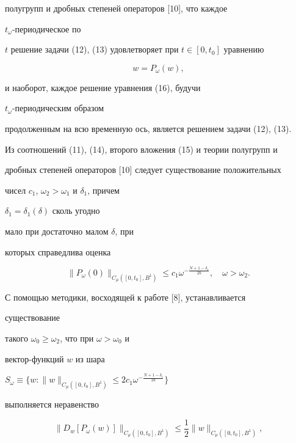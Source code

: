 полугрупп и дробных степеней операторов [10], что каждое 


$t_\omega$-периодическое по 


$t$ решение задачи (12), (13) удовлетворяет при $t\in[0,t_0]$ уравнению 


\begin{equation} 


w=P_\omega(w), 


\end{equation} 


и наоборот, каждое решение уравнения (16), будучи 


$t_\omega$-периодическим образом 


продолженным на всю временную ось, является решением задачи (12), (13). 


 


Из соотношений (11), (14), второго вложения (15) и теории полугрупп и  


дробных степеней операторов [10] следует существование положительных 


чисел $c_1$, $\omega_2>\omega_1$ и $\delta_1$, причем


$\delta_1=\delta_1(\delta)$ сколь угодно 


мало при достаточно малом $\delta$, при 


которых справедлива оценка 


\begin{equation} 


\|P_\omega(0)\|_{C_\mu([0,t_0],B^1)}\le c_1 


\omega^{-\frac{N+1-\delta_1}{2k}},\quad \omega>\omega_2. 


\end{equation} 


С помощью методики, восходящей к работе [8], устанавливается 


существование  


такого $\omega_0\ge\omega_2$, что при $\omega>\omega_0$ и 


вектор-функций $w$ из шара 


$S_\omega\equiv\{w:\|w\|_{C_\mu([0,t_0],B^1)}\le 2c_1 


\omega^{-\frac{N+1-\delta_1}{2k}}\}$ 


выполняется неравенство  


\begin{equation} 


\|D_w[P_\omega(w)]\|_{C_\mu([0,t_0],B^1)}\le\frac{1}{2} 


\|w\|_{C_\mu([0,t_0],B^1)}, 


\end{equation} 


